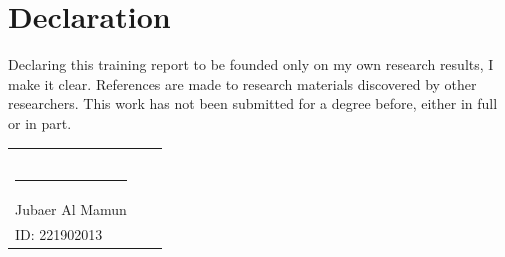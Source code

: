 \chapter*{\centering Declaration}

Declaring this training report to be founded only on my own research results, I make it clear. References are made to research materials discovered by other researchers. This work has not been submitted for a degree before, either in full or in part.


\bigskip
\bigskip
\bigskip


\begin{tabular}{p{5cm}p{5cm}p{5cm}}
\centering
     &  &   \\
     &  &   \\
     &  &   \\
 \rule{4cm}{1pt} 
 \\
  Jubaer Al Mamun \\
  ID: 221902013

  
\end{tabular}